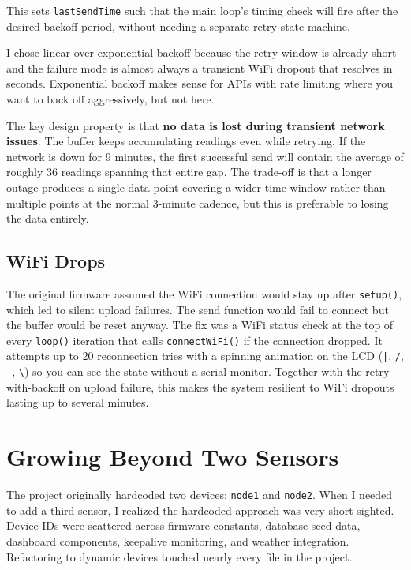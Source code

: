 \documentclass[11pt, letterpaper]{article}
\begin{document}
This sets \texttt{lastSendTime} such that the main loop's timing check will fire after the desired backoff period, without needing a separate retry state machine.

I chose linear over exponential backoff because the retry window is already short and the failure mode is almost always a transient WiFi dropout that resolves in seconds. Exponential backoff makes sense for APIs with rate limiting where you want to back off aggressively, but not here.

The key design property is that \textbf{no data is lost during transient network issues}. The buffer keeps accumulating readings even while retrying. If the network is down for 9 minutes, the first successful send will contain the average of roughly 36 readings spanning that entire gap. The trade-off is that a longer outage produces a single data point covering a wider time window rather than multiple points at the normal 3-minute cadence, but this is preferable to losing the data entirely.

\subsection{WiFi Drops}

The original firmware assumed the WiFi connection would stay up after \texttt{setup()}, which led to silent upload failures. The send function would fail to connect but the buffer would be reset anyway. The fix was a WiFi status check at the top of every \texttt{loop()} iteration that calls \texttt{connectWiFi()} if the connection dropped. It attempts up to 20 reconnection tries with a spinning animation on the LCD (\texttt{|}, \texttt{/}, \texttt{-}, \texttt{\textbackslash}) so you can see the state without a serial monitor. Together with the retry-with-backoff on upload failure, this makes the system resilient to WiFi dropouts lasting up to several minutes.


\section{Growing Beyond Two Sensors}

The project originally hardcoded two devices: \texttt{node1} and \texttt{node2}. When I needed to add a third sensor, I realized the hardcoded approach was very short-sighted. Device IDs were scattered across firmware constants, database seed data, dashboard components, keepalive monitoring, and weather integration. Refactoring to dynamic devices touched nearly every file in the project.
\end{document}
